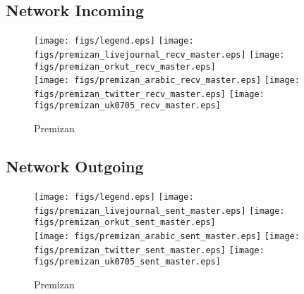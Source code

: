 \documentclass{article}
\newcommand{\bline}[1][1]{\vspace{#1\baselineskip}}
\begin{document}
\subsection{Network Incoming}
\begin{figure}[!h]
  \bline[1]
  \centering
  \texttt{[image: figs/legend.eps]}\hspace{3em}%
  \texttt{[image: figs/premizan\_livejournal\_recv\_master.eps]}\hspace{1em}%
  \texttt{[image: figs/premizan\_orkut\_recv\_master.eps]}\\
  \texttt{[image: figs/premizan\_arabic\_recv\_master.eps]}\hspace{1em}%
  \texttt{[image: figs/premizan\_twitter\_recv\_master.eps]}\hspace{1em}%
  \texttt{[image: figs/premizan\_uk0705\_recv\_master.eps]}
  \caption{Premizan}
\end{figure}

\pagebreak
\subsection{Network Outgoing}
\begin{figure}[!h]
  \bline[1]
  \centering
  \texttt{[image: figs/legend.eps]}\hspace{3em}%
  \texttt{[image: figs/premizan\_livejournal\_sent\_master.eps]}\hspace{1em}%
  \texttt{[image: figs/premizan\_orkut\_sent\_master.eps]}\\
  \texttt{[image: figs/premizan\_arabic\_sent\_master.eps]}\hspace{1em}%
  \texttt{[image: figs/premizan\_twitter\_sent\_master.eps]}\hspace{1em}%
  \texttt{[image: figs/premizan\_uk0705\_sent\_master.eps]}
  \caption{Premizan}
\end{figure}
\end{document}
